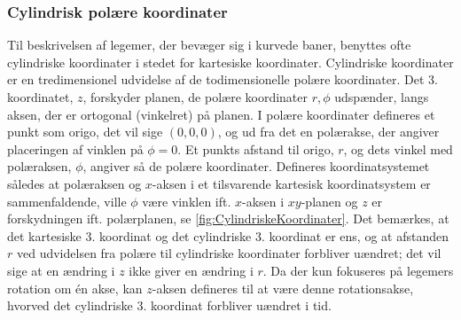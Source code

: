 \subsubsection{Cylindrisk polære koordinater}
Til beskrivelsen af legemer, der bevæger sig i kurvede baner, benyttes ofte cylindriske koordinater i stedet for kartesiske koordinater. Cylindriske koordinater er en tredimensionel udvidelse af de todimensionelle polære koordinater. Det 3. koordinatet, $z$, forskyder planen, de polære koordinater $r,\phi$ udspænder, langs aksen, der er ortogonal (vinkelret) på planen. I polære koordinater defineres et punkt som origo, det vil sige $(0,0,0)$, og ud fra det en polærakse, der angiver placeringen af vinklen på $\phi = 0$. Et punkts afstand til origo, $r$, og dets vinkel med polæraksen, $\phi$, angiver så de polære koordinater. Defineres koordinatsystemet således at polæraksen og $x$-aksen i et tilsvarende kartesisk koordinatsystem er sammenfaldende, ville $\phi$ være vinklen ift. $x$-aksen i $xy$-planen og $z$ er forskydningen ift. polærplanen, se \cref{fig:CylindriskeKoordinater}. Det bemærkes, at det kartesiske 3. koordinat og det cylindriske 3. koordinat er ens, og at afstanden $r$ ved udvidelsen fra polære til cylindriske koordinater forbliver uændret; det vil sige at en ændring i $z$ ikke giver en ændring i $r$. Da der kun fokuseres på legemers rotation om én akse, kan $z$-aksen defineres til at være denne rotationsakse, hvorved det cylindriske 3. koordinat forbliver uændret i tid.  \\

